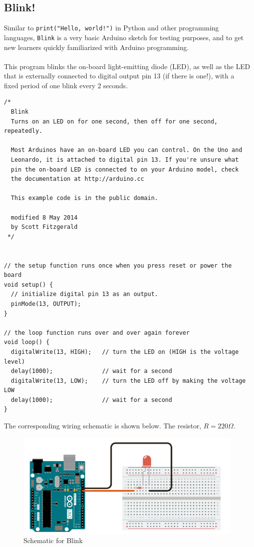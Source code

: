 \documentclass{article}
\begin{document}
\subsection{Blink!} \label{blink}
Similar to \texttt{print("Hello, world!")} in Python and other programming languages, \texttt{Blink} is a very basic Arduino sketch for testing purposes, and to get new learners quickly familiarized with Arduino programming. \\\\This program blinks the on-board light-emitting diode (LED), as well as the LED that is externally connected to digital output pin 13 (if there is one!), with a fixed period of one blink every 2 seconds.
\begin{lstlisting}[label={list:first}, style=Arduino, caption=Blink.ino]
/*
  Blink
  Turns on an LED on for one second, then off for one second, repeatedly.

  Most Arduinos have an on-board LED you can control. On the Uno and
  Leonardo, it is attached to digital pin 13. If you're unsure what
  pin the on-board LED is connected to on your Arduino model, check
  the documentation at http://arduino.cc

  This example code is in the public domain.

  modified 8 May 2014
  by Scott Fitzgerald
 */


// the setup function runs once when you press reset or power the board
void setup() {
  // initialize digital pin 13 as an output.
  pinMode(13, OUTPUT);
}

// the loop function runs over and over again forever
void loop() {
  digitalWrite(13, HIGH);   // turn the LED on (HIGH is the voltage level)
  delay(1000);              // wait for a second
  digitalWrite(13, LOW);    // turn the LED off by making the voltage LOW
  delay(1000);              // wait for a second
}
\end{lstlisting}
\noindent The corresponding wiring schematic is shown below. The resistor, $R=220\Omega$.
\begin{figure}[H]
    \centering
    \includegraphics[width=.6\textwidth]{blink.jpg}
    \caption{Schematic for Blink}
    \label{fig:blink}
\end{figure}
\end{document}
